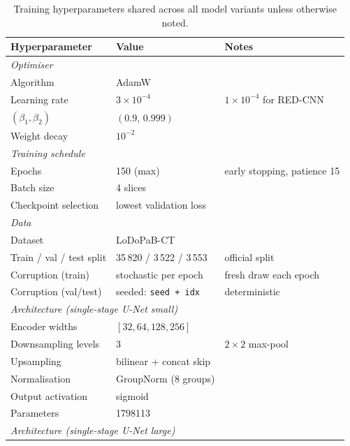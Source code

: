 \begin{table}[!htb]
    \centering
    \caption[Complete training hyperparameters.]{%
        Training hyperparameters shared across all model variants unless otherwise noted.}
    \label{tab:app_hyperparams}
    \setlength{\tabcolsep}{5pt}
    \small
    \begin{tabular}{@{}lll@{}}
        \toprule
        Hyperparameter & Value & Notes \\
        \midrule
        \multicolumn{3}{l}{\textit{Optimiser}} \\
        Algorithm       & AdamW & \\
        Learning rate   & $3\times10^{-4}$ & $1\times10^{-4}$ for RED-CNN \\
        $(\beta_1,\beta_2)$ & $(0.9,\,0.999)$ & \\
        Weight decay    & $10^{-2}$ & \\
        \midrule
        \multicolumn{3}{l}{\textit{Training schedule}} \\
        Epochs          & 150 (max) & early stopping, patience 15 \\
        Batch size      & 4 slices & \\
        Checkpoint selection & lowest validation loss & \\
        \midrule
        \multicolumn{3}{l}{\textit{Data}} \\
        Dataset         & LoDoPaB-CT~\cite{Leuschner2021} & \\
        Train / val / test split & 35\,820 / 3\,522 / 3\,553 & official split \\
        Corruption (train) & stochastic per epoch & fresh draw each epoch \\
        Corruption (val/test) & seeded: \texttt{seed\,+\,idx} & deterministic \\
        \midrule
        \multicolumn{3}{l}{\textit{Architecture (single-stage U-Net small)}} \\
        Encoder widths  & $[32,64,128,256]$ & \\
        Downsampling levels & 3 & $2\times2$ max-pool \\
        Upsampling      & bilinear + concat skip & \\
        Normalisation   & GroupNorm (8 groups) & \\
        Output activation & sigmoid & \\
        Parameters      & \num{1798113} & \\
        \midrule
        \multicolumn{3}{l}{\textit{Architecture (single-stage U-Net large)}} \\

\end{tabular}
\end{table}
